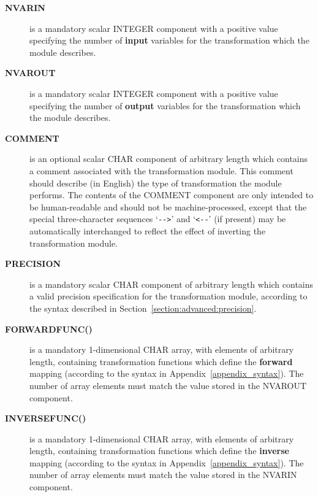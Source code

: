 \documentclass[twoside,11pt]{article}
\renewcommand{\_}{\texttt{\symbol{95}}}
\newcommand{\name}[1]{\mbox{\small{#1}}}
\begin{document}
\begin{description}

\item[\textbf{\name{NVAR\_IN}}] is a mandatory scalar \name{\_INTEGER}
component with a positive value specifying the number of \textbf{input}
variables for the transformation which the module describes.

\item[\textbf{\name{NVAR\_OUT}}] is a mandatory scalar \name{\_INTEGER}
component with a positive value specifying the number of \textbf{output}
variables for the transformation which the module describes.

\item[\textbf{\name{COMMENT}}] is an optional scalar \name{\_CHAR} component of
arbitrary length which contains a comment associated with the transformation
module.
This comment should describe (in English) the type of transformation the
module performs.
The contents of the \name{COMMENT} component are only intended to be
human-readable and should not be machine-processed, except that the special
three-character sequences `\verb#-->#' and `\verb#<--#' (if present) may be
automatically interchanged to reflect the effect of inverting the
transformation module.

\item[\textbf{\name{PRECISION}}] is a mandatory scalar \name{\_CHAR} component
of arbitrary length which contains a valid precision specification for the
transformation module, according to the syntax described in
Section~\ref{section:advanced:precision}.

\item[\textbf{\name{FORWARD\_FUNC()}}] is a mandatory 1-dimensional
\name{\_CHAR} array, with elements of arbitrary length, containing
transformation functions which define the \textbf{forward} mapping (according
to the syntax in Appendix~\ref{appendix_syntax}).
The number of array elements must match the value stored in the \name{NVAR\_OUT}
component.

\item[\textbf{\name{INVERSE\_FUNC()}}] is a mandatory 1-dimensional
\name{\_CHAR} array, with elements of arbitrary length, containing
transformation functions which define the \textbf{inverse} mapping
(according to the syntax in Appendix~\ref{appendix_syntax}).
The number of array elements must match the value stored in the
\name{NVAR\_IN} component.

\end{description}
\end{document}
